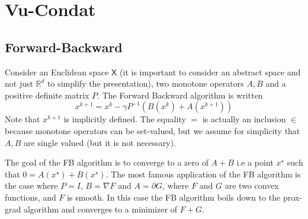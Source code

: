 \documentclass{article}
\newcommand{\bR}{{\mathbb R}}
\newcommand{\sX}{{\mathsf X}}
\theoremstyle{definition}
\begin{document}
\section{Vu-Condat}
\subsection{Forward-Backward}
Consider an Euclidean space $\sX$ (it is important to consider an abstract space and not just $\bR^d$ to simplify the presentation), two monotone operators $A,B$ and a positive definite matrix $P$.
The Forward Backward algorithm is written
\begin{equation}
    \label{eq:FB}
    x^{k+1} = x^k - \gamma P^{-1} (B(x^k) + A(x^{k+1}))
\end{equation}
Note that $x^{k+1}$ is implicitly defined. The equality $=$ is actually an inclusion $\in$ because monotone operators can be set-valued, but we assume for simplicity that $A,B$ are single valued (but it is not necessary).

The goal of the FB algorithm is to converge to a zero of $A+B$ i.e a point $x^\star$ such that $0 = A(x^\star) + B(x^\star)$. The most famous application of the FB algorithm is the case where $P=I$, $B = \nabla F$ and $A = \partial G$, where $F$ and $G$ are two convex functions, and $F$ is smooth. In this case the FB algorithm boils down to the prox-grad algorithm and converges to a minimizer of $F+G$.
\end{document}
